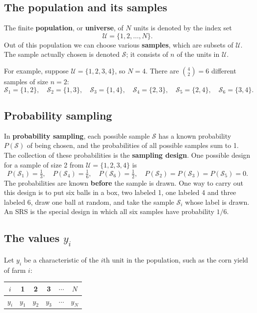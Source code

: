 \documentclass[
  letterpaper,
  DIV=11,
  numbers=noendperiod]{scrreprt}
\newcounter{none} %
\renewcommand{\[}{\begin{equation}}
\renewcommand{\]}{\end{equation}}
\begin{document}
\subsection{The population and its
samples}\label{the-population-and-its-samples}

The finite \textbf{population}, or \textbf{universe}, of \(N\) units is
denoted by the index set \[
\mathcal{U} = \{1, 2, \ldots, N\}.
\] Out of this population we can choose various \textbf{samples}, which
are subsets of \(\mathcal{U}\). The sample actually chosen is denoted
\(\mathcal{S}\); it consists of \(n\) of the units in \(\mathcal U\).

For example, suppose \(\mathcal{U} = \{1,2,3,4\}\), so \(N=4\). There
are \(\binom42 = 6\) different samples of size \(n=2\): \[
\mathcal{S}_1=\{1,2\},\quad \mathcal{S}_2=\{1,3\},\quad \mathcal{S}_3=\{1,4\},\quad
\mathcal{S}_4=\{2,3\},\quad \mathcal{S}_5=\{2,4\},\quad \mathcal{S}_6=\{3,4\}.
\]

\subsection{Probability sampling}\label{probability-sampling}

In \textbf{probability sampling}, each possible sample \(\mathcal{S}\)
has a known probability \(P(\mathcal{S})\) of being chosen, and the
probabilities of all possible samples sum to 1. The collection of these
probabilities is the \textbf{sampling design}. One possible design for a
sample of size 2 from \(\mathcal{U}=\{1,2,3,4\}\) is \[
P(\mathcal{S}_1)=\tfrac13,\quad P(\mathcal{S}_4)=\tfrac16,\quad P(\mathcal{S}_6)=\tfrac12,
\quad P(\mathcal{S}_2)=P(\mathcal{S}_3)=P(\mathcal{S}_5)=0 .
\] The probabilities are known \textbf{before} the sample is drawn. One
way to carry out this design is to put six balls in a box, two labeled
1, one labeled 4 and three labeled 6, draw one ball at random, and take
the sample \(\mathcal S_i\) whose label is drawn. An SRS is the special
design in which all six samples have probability \(1/6\).

\subsection{\texorpdfstring{The values
\(y_i\)}{The values y\_i}}\label{the-values-y_i}

Let \(y_i\) be a characteristic of the \(i\)th unit in the population,
such as the corn yield of farm \(i\):

{\def\LTcaptype{none} %
\begin{longtable}[]{@{}cccccc@{}}
\toprule\noalign{}
\(i\) & 1 & 2 & 3 & \(\cdots\) & \(N\) \\
\midrule\noalign{}
\endhead
\bottomrule\noalign{}
\endlastfoot
\(y_i\) & \(y_1\) & \(y_2\) & \(y_3\) & \(\cdots\) & \(y_N\) \\
\end{longtable}
}
\end{document}

